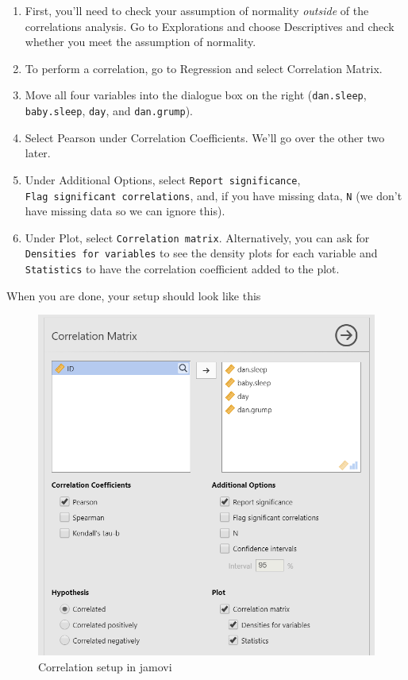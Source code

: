 \documentclass[
]{book}
\begin{document}
\begin{enumerate}
\def\labelenumi{\arabic{enumi}.}
\item
  First, you'll need to check your assumption of normality \emph{outside} of the correlations analysis. Go to Explorations and choose Descriptives and check whether you meet the assumption of normality.
\item
  To perform a correlation, go to Regression and select Correlation Matrix.
\item
  Move all four variables into the dialogue box on the right (\texttt{dan.sleep}, \texttt{baby.sleep}, \texttt{day}, and \texttt{dan.grump}).
\item
  Select Pearson under Correlation Coefficients. We'll go over the other two later.
\item
  Under Additional Options, select \texttt{Report\ significance}, \texttt{Flag\ significant\ correlations}, and, if you have missing data, \texttt{N} (we don't have missing data so we can ignore this).
\item
  Under Plot, select \texttt{Correlation\ matrix}. Alternatively, you can ask for \texttt{Densities\ for\ variables} to see the density plots for each variable and \texttt{Statistics} to have the correlation coefficient added to the plot.
\end{enumerate}

When you are done, your setup should look like this

\begin{figure}

{\centering \includegraphics[width=0.8\linewidth]{images/08-correlation/correlation-setup} 

}

\caption{Correlation setup in jamovi}\label{fig:unnamed-chunk-7}
\end{figure}
\end{document}
